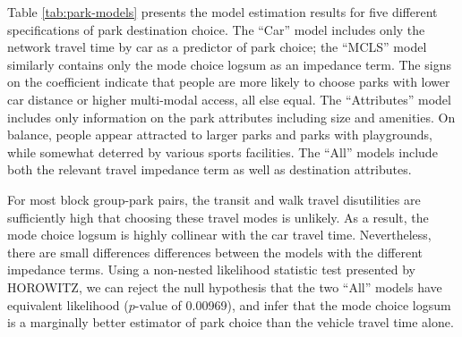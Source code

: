 \documentclass[3p, authoryear]{elsarticle} %
\begin{document}
Table \ref{tab:park-models} presents the model estimation results for
five different specifications of park destination choice. The ``Car'' model
includes only the network travel time by car as a predictor of park choice;
the ``MCLS'' model similarly contains only the mode choice logsum as an
impedance term. The signs on the coefficient indicate that people are more
likely to choose parks with lower car distance or higher multi-modal access, all
else equal. The ``Attributes'' model includes only information on the park attributes
including size and amenities. On balance, people appear attracted to larger parks
and parks with playgrounds, while somewhat deterred by various sports facilities.
The ``All'' models include both the relevant travel impedance term as well as
destination attributes.

For most block group-park pairs, the transit and walk travel disutilities
are sufficiently high that choosing these travel modes is unlikely. As a
result, the mode choice logsum is highly collinear with the car travel time.
Nevertheless, there are small differences differences between the models
with the different impedance terms. Using a non-nested likelihood statistic
test presented by HOROWITZ, we can reject the null hypothesis that the two
``All'' models have equivalent likelihood (\(p\)-value of 0.00969), and infer
that the mode choice logsum is a marginally better estimator of park choice than
the vehicle travel time alone.
\end{document}
